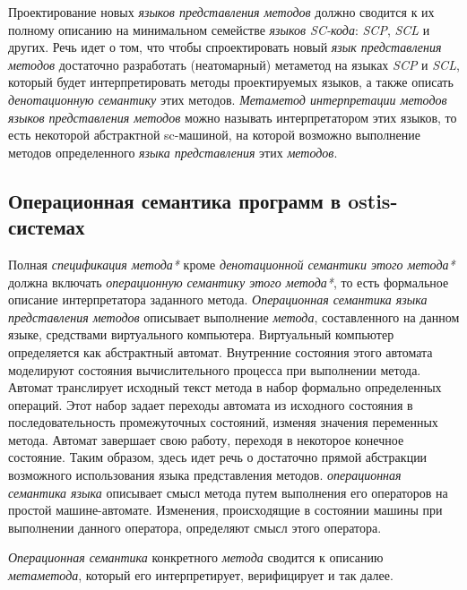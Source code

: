 \begin{textitemize}
    \item Проектирование новых \textit{языков представления методов} должно сводится к их полному описанию на минимальном семействе \textit{языков SC-кода}: \textit{SCP}, \textit{SCL} и других. Речь идет о том, что чтобы спроектировать новый \textit{язык представления методов} достаточно разработать (неатомарный) метаметод на языках \textit{SCP} и \textit{SCL}, который будет интерпретировать методы проектируемых языков, а также описать \textit{денотационную семантику} этих методов. \textit{Метаметод интерпретации методов языков представления методов} можно называть интерпретатором этих языков, то есть некоторой абстрактной sc-машиной, на которой возможно выполнение методов определенного \textit{языка представления} этих \textit{методов}.
\end{textitemize}

\subsection{Операционная семантика программ в ostis-системах}
\label{sec_programs_method_op_semantic}

Полная \textit{спецификация метода*} кроме \textit{денотационной семантики этого метода*} должна включать \textit{операционную семантику этого метода*}, то есть формальное описание интерпретатора заданного метода. \textit{Операционная семантика языка представления методов} описывает выполнение \textit{метода}, составленного на данном языке, средствами виртуального компьютера. Виртуальный компьютер определяется как абстрактный автомат. Внутренние состояния этого автомата моделируют состояния вычислительного процесса при выполнении метода. Автомат транслирует исходный текст метода в набор формально определенных операций. Этот набор задает переходы автомата из исходного состояния в последовательность промежуточных состояний, изменяя значения переменных метода. Автомат завершает свою работу, переходя в некоторое конечное состояние. Таким образом, здесь идет речь о достаточно прямой абстракции возможного использования языка представления методов. \textit{операционная семантика языка} описывает смысл метода путем выполнения его операторов на простой машине-автомате. Изменения, происходящие в состоянии машины при выполнении данного оператора, определяют смысл этого оператора.

\textit{Операционная семантика} конкретного \textit{метода} сводится к описанию \textit{метаметода}, который его интерпретирует, верифицирует и так далее.

